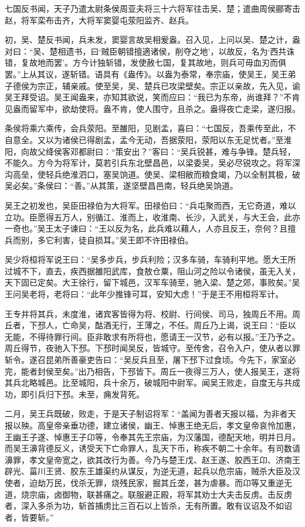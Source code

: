 \documentclass[]{article}
\begin{document}
七国反书闻，天子乃遣太尉条侯周亚夫将三十六将军往击吴、楚；遣曲周侯郦寄击赵，将军栾布击齐，大将军窦婴屯荥阳监齐、赵兵。

初，吴、楚反书闻，兵未发，窦婴言故吴相爰盎。召入见，上问以吴、楚之计，盎对曰：``吴、楚相遗书，曰`贼臣朝错擅適诸侯，削夺之地'，以故反，名为`西共诛错，复故地而罢'。方今计独斩错，发使赦七国，复其故地，则兵可毋血刃而俱罢。''上从其议，遂斩错。语具有《盎传》。以盎为泰常，奉宗庙，使吴王，吴王弟子德侯为宗正，辅亲戚。使至吴，吴、楚兵已攻梁壁矣。宗正以亲故，先入见，谕吴王拜受诏。吴王闻盎来，亦知其欲说，笑而应曰：``我已为东帝，尚谁拜？''不肯见盎而留军中，欲劫使将。盎不肯，使人围守，且杀之。盎得夜亡走梁，遂归报。

条侯将乘六乘传，会兵荥阳。至雒阳，见剧孟，喜曰：``七国反，吾乘传至此，不自意全。又以为诸侯已得剧孟，孟今无动，吾据荥阳，荥阳以东无足忧者。''至淮阳，向故父绛侯客邓都尉曰：``策安出？''客曰：``吴兵锐甚，难与争锋。楚兵轻，不能久。方今为将军计，莫若引兵东北壁昌邑，以梁委吴，吴必尽锐攻之。将军深沟高垒，使轻兵绝淮泗口，塞吴饷道。使吴、梁相敝而粮食竭，乃以全制其极，破吴必矣。''条侯曰：``善。''从其策，遂坚壁昌邑南，轻兵绝吴饷道。

吴王之初发也，吴臣田禄伯为大将军。田禄伯曰：``兵屯聚而西，无它奇道，难以立功。臣愿得五万人，别循江、淮而上，收淮南、长沙，入武关，与大王会，此亦一奇也。''吴王太子谏曰：``王以反为名，此兵难以藉人，人亦且反王，奈何？且擅兵而别，多它利害，徒自损耳。''吴王即不许田禄伯。

吴少将桓将军说王曰：``吴多步兵，步兵利险；汉多车骑，车骑利平地。愿大王所过城不下，直去，疾西据雒阳武库，食敖仓粟，阻山河之险以令诸侯，虽无入关，天下固已定矣。大王徐行，留下城邑，汉军车骑至，驰入梁、楚之郊，事败矣。''吴王问吴老将，老将曰：``此年少推锋可耳，安知大虑！''于是王不用桓将军计。

王专并将其兵，未度淮，诸宾客皆得为将、校尉、行间侯、司马，独周丘不用。周丘者，下邳人，亡命吴，酤酒无行，王薄之，不任。周丘乃上谒，说王曰：``臣以无能，不得待罪行间。臣非敢求有所将也，愿请王一汉节，必有以报。''王乃予之。周丘得节，夜驰入下邳。下邳时闻吴反，皆城守。至传舍，召令入户，使从者以罪斩令。遂召昆弟所善豪吏告曰：``吴反兵且至，屠下邳下过食顷。今先下，家室必完，能者封侯至矣。''出乃相告，下邳皆下。周丘一夜得三万人，使人报吴王，遂将其兵北略城邑。比至城阳，兵十余万，破城阳中尉军。闻吴王败走，自度无与共成功，即引兵归下邳。未至，痈发背死。

二月，吴王兵既破，败走，于是天子制诏将军：``盖闻为善者天报以福，为非者天报以殃。高皇帝亲垂功德，建立诸侯，幽王、悼惠王绝无后，孝文皇帝哀怜加惠，王幽王子遂、悼惠王子卬等，令奉其先王宗庙，为汉藩国，德配天地，明并日月。而吴王濞背德反义，诱受天下亡命罪人，乱天下币，称疾不朝二十余年。有司数请濞罪，孝文皇帝宽之，欲其改行为善。今乃与楚王戊、赵王遂、胶西王卬、济南王辟光、菑川王贤、胶东王雄渠约从谋反，为逆无道，起兵以危宗庙，贼杀大臣及汉使者，迫劫万民，伐杀无罪，烧残民家，掘其丘垄，甚为虐暴。而卬等又重逆无道，烧宗庙，卤御物，联甚痛之。联服避正殿，将军其劝士大夫击反虏。击反虏者，深入多杀为功，斩首捕虏比三百石以上皆杀，无有所置。敢有议诏及不如诏者，皆要斩。''
\end{document}
